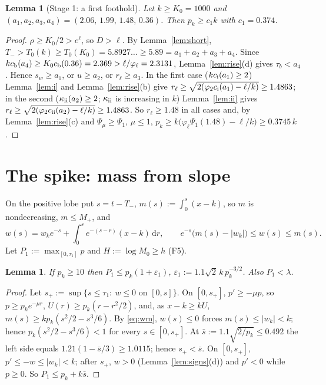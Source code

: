 \documentclass[11pt,a4paper]{article}
\newtheorem{lemma}[theorem]{Lemma}
\theoremstyle{remark}\newtheorem{remark}[theorem]{Remark}
\newcommand{\dd}{\,\mathrm d}
\begin{document}
\begin{lemma}[Stage 1: a first foothold]\label{lem:stage1}
Let $k\ge K_0=1000$ and $(a_1,a_2,a_3,a_4)=(2.06,\,1.99,\,1.48,\,0.36)$. Then $p_k\ge c_1k$ with
$c_1=0.374$.
\end{lemma}
\begin{proof}
$\rho\ge K_0/2>e^\ell$, so $D>\ell$. By Lemma~\ref{lem:short},
$T_->T_0(k)\ge T_0(K_0)=5.8927\ldots\ge5.89=a_1+a_2+a_3+a_4$. Since $kc_{\rm b}(a_4)\ge
K_0c_{\rm b}(0.36)=2.369>\ell/\varphi_\ell=2.3131$, Lemma~\ref{lem:rise}(d) gives $\tau_b<a_4$.
Hence $s_w\ge a_1$, or $u\ge a_2$, or $r_\ell\ge a_3$. In the first case
($kc_{\rm i}(a_1)\ge2$) Lemma~\ref{lem:i} and Lemma~\ref{lem:rise}(b) give
$r_\ell\ge\sqrt{2(\varphi_2c_{\rm i}(a_1)-\ell/k)}\ge1.4863$; in the second
($\kappa_{\rm ii}(a_2)\ge2$; $\kappa_{\rm ii}$ is increasing in $k$) Lemma~\ref{lem:ii} gives
$r_\ell\ge\sqrt{2(\varphi_2c_{\rm ii}(a_2)-\ell/k)}\ge1.4863$. So $r_\ell\ge1.48$ in all cases and,
by Lemma~\ref{lem:rise}(c) and $\Psi_\mu\ge\Psi_1$, $\mu\le1$,
$p_k\ge k\bigl(\varphi_\ell\Psi_1(1.48)-\ell/k\bigr)\ge0.3745\,k$.
\end{proof}

\section{The spike: mass from slope}
On the positive lobe put $s=t-T_-$, $m(s):=\int_0^s(x-k)$, so $m$ is nondecreasing, $m\le M_+$, and
\begin{equation}\label{eq:wm}
w(s)=w_ke^{-s}+\int_0^se^{-(s-r)}(x-k)\dd r,\qquad e^{-s}\bigl(m(s)-|w_k|\bigr)\le w(s)\le m(s).
\end{equation}
Let $P_1:=\max_{[0,\tau_1]}p$ and $H:=\log M_0\ge h$ (F5).

\begin{lemma}\label{lem:P1}
If $p_k\ge10$ then $P_1\le p_k(1+\varepsilon_1)$, $\varepsilon_1:=1.1\sqrt2\,k\,p_k^{-3/2}$. Also
$P_1<\lambda$.
\end{lemma}
\begin{proof}
Let $s_+:=\sup\{s\le\tau_1:\ w\le0\text{ on }[0,s]\}$. On $[0,s_+]$, $p'\ge-\mu p$, so
$p\ge p_ke^{-\mu r}$, $U(r)\ge p_k(r-r^2/2)$, and, as $x-k\ge kU$, $m(s)\ge kp_k(s^2/2-s^3/6)$.
By \eqref{eq:wm}, $w(s)\le0$ forces $m(s)\le|w_k|<k$; hence $p_k(s^2/2-s^3/6)<1$ for every
$s\in[0,s_+]$. At $\bar s:=1.1\sqrt{2/p_k}\le0.492$ the left side equals
$1.21(1-\bar s/3)\ge1.0115$; hence $s_+<\bar s$. On $[0,s_+]$, $p'\le-w\le|w_k|<k$; after
$s_+$, $w>0$ (Lemma~\ref{lem:signs}(d)) and $p'<0$ while $p\ge0$. So $P_1\le p_k+k\bar s$.
\end{proof}
\end{document}
